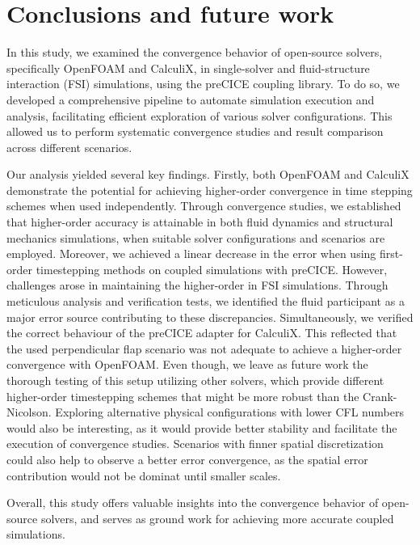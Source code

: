 \documentclass[
  english,        %
  font=times,     %
  onecolumn,      %
]{tumarticle}
\begin{document}
\section{Conclusions and future work}

In this study, we examined the convergence behavior of open-source solvers, specifically OpenFOAM and CalculiX, in single-solver and fluid-structure interaction (FSI) simulations, using the preCICE coupling library. To do so, we developed a comprehensive pipeline to automate simulation execution and analysis, facilitating efficient exploration of various solver configurations. This allowed us to perform systematic convergence studies and result comparison across different scenarios. 

Our analysis yielded several key findings. Firstly, both OpenFOAM and CalculiX demonstrate the potential for achieving higher-order convergence in time stepping schemes when used independently. Through convergence studies, we established that higher-order accuracy is attainable in both fluid dynamics and structural mechanics simulations, when suitable solver configurations and scenarios are employed.
Moreover, we achieved a linear decrease in the error when using first-order timestepping methods on coupled simulations with preCICE. However, challenges arose in maintaining the higher-order in FSI simulations. Through meticulous analysis and verification tests, we identified the fluid participant as a major error source contributing to these discrepancies. Simultaneously, we verified the correct behaviour of the preCICE adapter for CalculiX. This reflected that the used perpendicular flap scenario was not adequate to achieve a higher-order convergence with OpenFOAM. Even though, we leave as future work the thorough testing of this setup utilizing other solvers, which provide different higher-order timestepping schemes that might be more robust than the Crank-Nicolson. Exploring alternative physical configurations with lower CFL numbers would also be interesting, as it would provide better stability and facilitate the execution of convergence studies. Scenarios with finner spatial discretization could also help to observe a better error convergence, as the spatial error contribution would not be dominat until smaller scales. 

Overall, this study offers valuable insights into the convergence behavior of open-source solvers, and serves as ground work for achieving more accurate coupled simulations.


\pagebreak

\printbibliography
\end{document}
